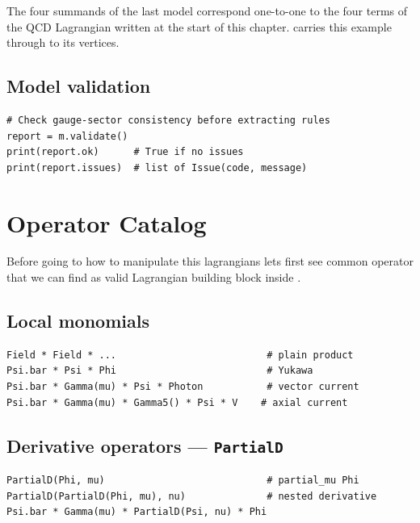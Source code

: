 \noindent The four summands of the last model correspond one-to-one to the four terms of the QCD Lagrangian written at the start of this chapter.  carries this example through to its vertices.

\subsection*{Model validation}

\begin{verbatim}
# Check gauge-sector consistency before extracting rules
report = m.validate()
print(report.ok)      # True if no issues
print(report.issues)  # list of Issue(code, message)
\end{verbatim}

\section{Operator Catalog}
\label{sec:feynpy-operators}

Before going to how to manipulate this lagrangians lets first see common operator that we can find as valid Lagrangian building block inside .

\subsection*{Local monomials}

\begin{verbatim}
Field * Field * ...                          # plain product
Psi.bar * Psi * Phi                          # Yukawa
Psi.bar * Gamma(mu) * Psi * Photon           # vector current
Psi.bar * Gamma(mu) * Gamma5() * Psi * V    # axial current
\end{verbatim}

\subsection*{Derivative operators --- \texttt{PartialD}}

\begin{verbatim}
PartialD(Phi, mu)                            # partial_mu Phi
PartialD(PartialD(Phi, mu), nu)              # nested derivative
Psi.bar * Gamma(mu) * PartialD(Psi, nu) * Phi
\end{verbatim}

